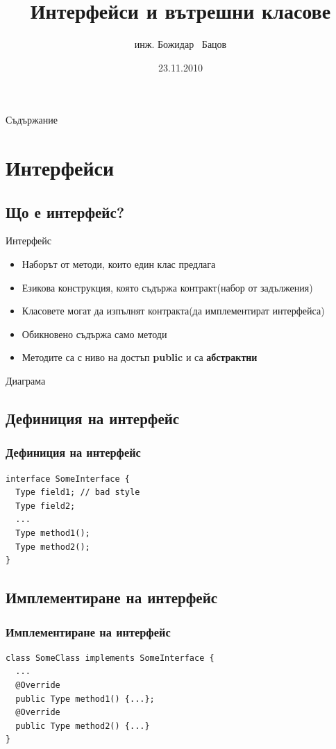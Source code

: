 \documentclass{beamer}
\title{Интерфейси и вътрешни класове}
\author{инж. Божидар ~Бацов}
\institute{Drow Ltd.}
\date{23.11.2010}
\begin{document}
\begin{frame}
  \titlepage
\end{frame}

\begin{frame}{Съдържание}
  \tableofcontents[pausesections]
\end{frame}

\section{Интерфейси}

\subsection{Що е интерфейс?}
\begin{frame}{Интерфейс}
  \begin{itemize}
  \item
    Наборът от методи, които един клас предлага
  \item
    Езикова конструкция, която съдържа контракт(набор
    от задължения)
  \item Класовете могат да изпълнят контракта(да имплементират
    интерфейса)
  \item Обикновено съдържа само методи
  \item Методите са с ниво на достъп \textbf{public} и са \textbf{абстрактни}
  \end{itemize}
\end{frame}

\begin{frame}{Диаграма}
  \transdissolve
  
\end{frame}

\subsection{Дефиниция на интерфейс}
\begin{frame}[fragile]
  \frametitle{Дефиниция на интерфейс}
  \transdissolve
\begin{lstlisting}
interface SomeInterface {
  Type field1; // bad style
  Type field2;
  ...
  Type method1();
  Type method2();
}
\end{lstlisting}
\end{frame}

\subsection{Имплементиране на интерфейс}
\begin{frame}[fragile]
  \frametitle{Имплементиране на интерфейс}
  \transdissolve
\begin{lstlisting}
class SomeClass implements SomeInterface {
  ...  
  @Override
  public Type method1() {...};
  @Override
  public Type method2() {...}
}
\end{lstlisting}
\end{frame}
\end{document}
